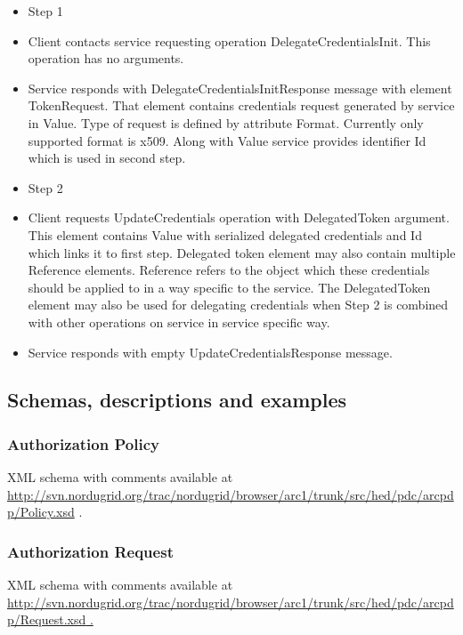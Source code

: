 \documentclass{article}
\newcommand\textstyleInternetlink[1]{\textcolor[rgb]{0.0,0.0,0.5019608}{#1}}
\newcommand\liststyleWWviiiNumix{%
\renewcommand\labelitemi{[F0B7?]}
\renewcommand\labelitemii{{}-}
\renewcommand\labelitemiii{${\blacksquare}$}
\renewcommand\labelitemiv{[F06C?]}
}
\newcommand\liststyleWWviiiNumx{%
\renewcommand\labelitemi{[F0B7?]}
\renewcommand\labelitemii{[F081?]}
\renewcommand\labelitemiii{${\blacksquare}$}
\renewcommand\labelitemiv{[F06C?]}
}
\begin{document}
\liststyleWWviiiNumix
\begin{itemize}
\item {\color{black}
Step 1}
\item {\color{black}
Client contacts service requesting operation DelegateCredentialsInit.
This operation has no arguments.}
\item {\color{black}
Service responds with DelegateCredentialsInitResponse message with
element TokenRequest. That element contains credentials request
generated by service in Value. Type of request is defined by attribute
Format. Currently only supported format is x509. Along with Value
service provides identifier Id which is used in second step.}
\end{itemize}
\liststyleWWviiiNumx
\begin{itemize}
\item {\color{black}
Step 2}
\item {\color{black}
Client requests UpdateCredentials operation with DelegatedToken
argument. This element contains Value with serialized delegated
credentials and Id which links it to first step. Delegated token
element may also contain multiple Reference elements. Reference refers
to the object which these credentials should be applied to in a way
specific to the service. The DelegatedToken element may also be used
for delegating credentials when Step 2 is combined with other
operations on service in service specific way.}
\item {\color{black}
Service responds with empty UpdateCredentialsResponse message.}
\end{itemize}
\subsection[Schemas, descriptions and examples]{Schemas, descriptions
and examples}
\label{bkm:Ref204010074}\subsubsection[Authorization
Policy]{Authorization Policy}
\label{bkm:Ref204009564}{\upshape\color{black}
XML schema with comments available at
\url{http://svn.nordugrid.org/trac/nordugrid/browser/arc1/trunk/src/hed/pdc/arcpdp/Policy.xsd}
.}

\subsubsection[Authorization Request]{Authorization Request}
\label{bkm:Ref204009595}{\upshape\color{black}
XML schema with comments available at
\url{http://svn.nordugrid.org/trac/nordugrid/browser/arc1/trunk/src/hed/pdc/arcpdp/Request.xsd}\href{http://svn.nordugrid.org/trac/nordugrid/browser/arc1/trunk/src/hed/pdc/arcpdp/Policy.xsd}{\textstyleInternetlink{
.}}}
\end{document}
